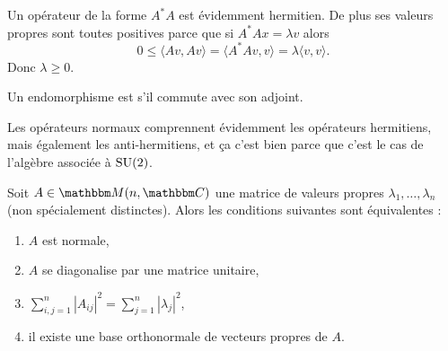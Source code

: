 \begin{remark}      \label{REMooMLBCooTuKFmz}
    Un opérateur de la forme \( A^*A\) est évidemment hermitien. De plus ses valeurs propres sont toutes positives parce que si \( A^*Ax=\lambda v\) alors
    \begin{equation}
        0\leq \langle Av, Av\rangle =\langle A^*Av, v\rangle =\lambda\langle v, v\rangle .
    \end{equation}
    Donc \( \lambda\geq 0\).
\end{remark}

\begin{definition}  \label{DefWQNooKEeJzv}
    Un endomorphisme est  s'il commute avec son adjoint.
\end{definition}

Les opérateurs normaux comprennent évidemment les opérateurs hermitiens, mais également les anti-hermitiens, et ça c'est bien parce que c'est le cas de l'algèbre associée à \( \operatorname{SU}(2)\).

\begin{theorem}    \label{ThogammwA}
    Soit \( A\in\eM(n,\eC)\) une matrice de valeurs propres \( \lambda_1,\ldots, \lambda_n\) (non spécialement distinctes). Alors les conditions suivantes sont équivalentes :
    \begin{enumerate}
        \item   \label{ItemJZhFPSi}
            \( A\) est normale,
        \item   \label{ItemJZhFPSii}
            \( A\) se diagonalise par une matrice unitaire,
        \item
            \( \sum_{i,j=1}^n| A_{ij} |^2=\sum_{j=1}^n| \lambda_j |^2\),
        \item
            il existe une base orthonormale de vecteurs propres de \( A\).
    \end{enumerate}
\end{theorem}

